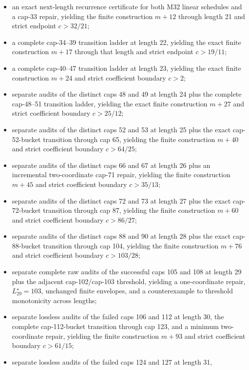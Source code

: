 \documentclass[11pt]{article}
\begin{document}
\begin{itemize}
  integer offset, and the strict multiplicative endpoint \(c>3/2\);
\item an exact next-length recurrence certificate for both M32 linear
  schedules and a cap-33 repair, yielding the finite construction \(m+12\)
  through length 21 and strict endpoint \(c>32/21\);
\item a complete cap-34--39 transition ladder at length 22, yielding the
  exact finite construction \(m+17\) through that length and strict endpoint
  \(c>19/11\);
\item a complete cap-40--47 transition ladder at length 23, yielding the
  exact finite construction \(m+24\) and strict coefficient boundary
  \(c>2\);
\item separate audits of the distinct caps 48 and 49 at length 24 plus the
  complete cap-48--51 transition ladder, yielding the exact finite
  construction \(m+27\) and strict coefficient boundary \(c>25/12\);
\item separate audits of the distinct caps 52 and 53 at length 25 plus the
  exact cap-52-bucket transition through cap 65, yielding the finite
  construction \(m+40\) and strict coefficient boundary \(c>64/25\);
\item separate audits of the distinct caps 66 and 67 at length 26 plus an
  incremental two-coordinate cap-71 repair, yielding the finite construction
  \(m+45\) and strict coefficient boundary \(c>35/13\);
\item separate audits of the distinct caps 72 and 73 at length 27 plus the
  exact cap-72-bucket transition through cap 87, yielding the finite
  construction \(m+60\) and strict coefficient boundary \(c>86/27\);
\item separate audits of the distinct caps 88 and 90 at length 28 plus the
  exact cap-88-bucket transition through cap 104, yielding the finite
  construction \(m+76\) and strict coefficient boundary \(c>103/28\);
\item separate complete raw audits of the successful caps 105 and 108 at
  length 29 plus the adjacent cap-102/cap-103 threshold, yielding a
  one-coordinate repair, \(L_{29}^{\star}=103\), unchanged finite envelopes,
  and a counterexample to threshold monotonicity across lengths;
\item separate lossless audits of the failed caps 106 and 112 at length 30,
  the complete cap-112-bucket transition through cap 123, and a minimum
  two-coordinate repair, yielding the finite construction \(m+93\) and
  strict coefficient boundary \(c>61/15\);
\item separate lossless audits of the failed caps 124 and 127 at length 31,

\end{itemize}
\end{document}
